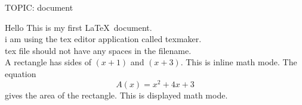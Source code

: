 \documentclass[11pt]{article}
\begin{document}
TOPIC: document

Hello This is my first \LaTeX\ document.\\
i am using the tex editor application called texmaker.\\
tex file should not have any spaces in the filename.\\
A rectangle has sides of $(x+1)$ and $(x+3)$. This is inline math mode.
The equation $${A(x)=x^2+4x+3}$$ gives the area of the rectangle. This is displayed math mode.
\end{document}
